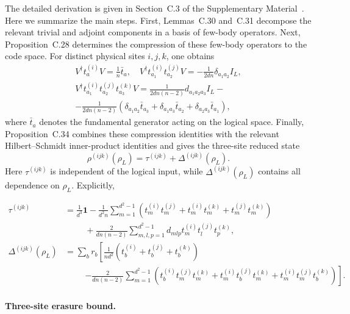 \documentclass[10pt,twocolumn,superscriptaddress,aps,amsmath,amssymb,citeautoscript,floatfix,prx]{revtex4-2}
\theoremstyle{plain}
\theoremstyle{plain}
\theoremstyle{plain}
\theoremstyle{plain}
\theoremstyle{plain}
\theoremstyle{plain}
\begin{document}
The detailed derivation is given in Section~C.3 of the Supplementary Material~\cite{SuppMat}. Here we summarize the main steps. First, Lemmas~C.30 and~C.31 decompose the relevant trivial and adjoint components in a basis of few-body operators. Next, Proposition~C.28 determines the compression of these few-body operators to the code space. For distinct physical sites $i,j,k$, one obtains
$$
\begin{gathered}
V^{\dagger} t_a^{(i)} V=\frac{1}{n} \bar{t}_a, \quad V^{\dagger} t_{a_1}^{(i)} t_{a_2}^{(j)} V=-\frac{1}{2 d n} \delta_{a_1 a_2} I_L, \\
V^{\dagger} t_{a_1}^{(i)} t_{a_2}^{(j)} t_{a_3}^{(k)} V=\frac{1}{2 d n(n-2)} d_{a_1 a_2 a_3} I_L-\\-\frac{1}{2 d n(n-2)}\left(\delta_{a_1 a_2} \bar{t}_{a_3}+\delta_{a_1 a_3} \bar{t}_{a_2}+\delta_{a_2 a_3} \bar{t}_{a_1}\right),
\end{gathered}
$$
where $\bar t_a$ denotes the fundamental generator acting on the logical space. Finally, Proposition~C.34 combines these compression identities with the relevant Hilbert--Schmidt inner-product identities and gives the three-site reduced state
\begin{equation}\label{eq:3q_reduced_state}
    \rho^{(ijk)}(\rho_L)
    =
    \tau^{(ijk)}
    +
    \Delta^{(ijk)}(\rho_L).
\end{equation}
Here $\tau^{(ijk)}$ is independent of the logical input, while $\Delta^{(ijk)}(\rho_L)$ contains all dependence on $\rho_L$. Explicitly,
\begin{widetext}
\begin{align}
\tau^{(ijk)}
&=
\frac{1}{d^3}\mathbf 1
-\frac{1}{d^2 n}
\sum_{m=1}^{d^2-1}
\left(
t_m^{(i)}t_m^{(j)}
+t_m^{(i)}t_m^{(k)}
+t_m^{(j)}t_m^{(k)}
\right)
\nonumber\\
&\hspace{1cm}
+\frac{2}{dn(n-2)}
\sum_{m,l,p=1}^{d^2-1}
d_{mlp}
t_m^{(i)}t_l^{(j)}t_p^{(k)},
\\
\Delta^{(ijk)}(\rho_L)
&=
\sum_b r_b
\left[
\frac{1}{nd^2}
\left(
t_b^{(i)}
+t_b^{(j)}
+t_b^{(k)}
\right)
\right.
\nonumber\\
&\hspace{1cm}
\left.
-\frac{2}{dn(n-2)}
\sum_{m=1}^{d^2-1}
\left(
t_b^{(i)}t_m^{(j)}t_m^{(k)}
+t_m^{(i)}t_b^{(j)}t_m^{(k)}
+t_m^{(i)}t_m^{(j)}t_b^{(k)}
\right)
\right].
\end{align}
\end{widetext}

\paragraph{Three-site erasure bound.}
\end{document}
